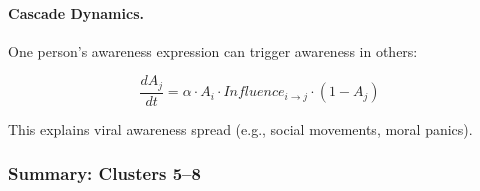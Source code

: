 \paragraph{Cascade Dynamics.}
One person's awareness expression can trigger awareness in others:

\begin{equation}
\frac{dA_j}{dt} = \alpha \cdot A_i \cdot Influence_{i \to j} \cdot (1 - A_j)
\end{equation}

This explains viral awareness spread (e.g., social movements, moral panics).

\subsubsection{Summary: Clusters 5--8}

